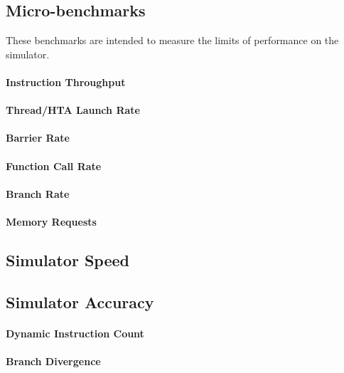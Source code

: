 \documentclass[conference, 10pt]{IEEEtran}
\begin{document}
\subsection{Micro-benchmarks}

These benchmarks are intended to measure the limits of performance on the
simulator.

\paragraph{Instruction Throughput}

\paragraph{Thread/HTA Launch Rate}

\paragraph{Barrier Rate}

\paragraph{Function Call Rate}

\paragraph{Branch Rate}

\paragraph{Memory Requests}

\subsection{Simulator Speed}

\subsection{Simulator Accuracy}

\paragraph{Dynamic Instruction Count}

\paragraph{Branch Divergence}
\end{document}
